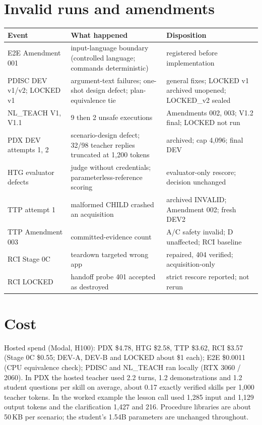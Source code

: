 \documentclass[10pt]{article}
\begin{document}
\section{Invalid runs and amendments}\label{app:invalid}
\begin{tabularx}{\linewidth}{@{}l>{\raggedright}X>{\raggedright\arraybackslash}X@{}}
\toprule
Event & What happened & Disposition \\
\midrule
E2E Amendment 001 & input-language boundary (controlled language; commands deterministic) & registered before implementation \\
PDISC DEV v1/v2; LOCKED v1 & argument-text failures; one-shot design defect; plan-equivalence tie & general fixes; LOCKED v1 archived unopened; LOCKED\_v2 sealed \\
NL\_TEACH V1, V1.1 & 9 then 2 unsafe executions & Amendments 002, 003; V1.2 final; LOCKED not run \\
PDX DEV attempts 1, 2 & scenario-design defect; 32/98 teacher replies truncated at 1{,}200 tokens & archived; cap 4{,}096; final DEV \\
HTG evaluator defects & judge without credentials; parameterless-reference scoring & evaluator-only rescore; decision unchanged \\
TTP attempt 1 & malformed CHILD crashed an acquisition & archived INVALID; Amendment 002; fresh DEV2 \\
TTP Amendment 003 & committed-evidence count & A/C safety invalid; D unaffected; RCI baseline \\
RCI Stage 0C & teardown targeted wrong app & repaired, 404 verified; acquisition-only \\
RCI LOCKED & handoff probe 401 accepted as destroyed & strict rescore reported; not rerun \\
\bottomrule
\end{tabularx}

\section{Cost}\label{app:cost}
Hosted spend (Modal, H100): PDX \$4.78, HTG \$2.58, TTP \$3.62, RCI \$3.57 (Stage 0C \$0.55; DEV-A, DEV-B and LOCKED about \$1 each); E2E \$0.0011 (CPU equivalence check); PDISC and NL\_TEACH ran locally (RTX 3060 / 2060). In PDX the hosted teacher used 2.2 turns, 1.2 demonstrations and 1.2 student questions per skill on average, about 0.17 exactly verified skills per 1{,}000 teacher tokens. In the worked example the lesson call used 1{,}285 input and 1{,}129 output tokens and the clarification 1{,}427 and 216. Procedure libraries are about 50\,KB per scenario; the student's 1.54B parameters are unchanged throughout.
\end{document}
